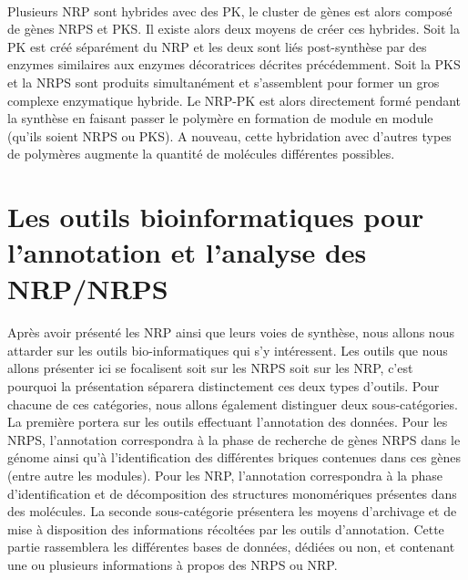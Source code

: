 \documentclass[12pt,french,twoside]{report}
\begin{document}
\paragraph{}Plusieurs NRP sont hybrides avec des PK, le cluster de gènes est alors composé de gènes NRPS et PKS.
Il existe alors deux moyens de créer ces hybrides.
Soit la PK est créé séparément du NRP et les deux sont liés post-synthèse par des enzymes similaires aux enzymes décoratrices décrites précédemment.
Soit la PKS et la NRPS sont produits simultanément et s'assemblent pour former un gros complexe enzymatique hybride.
Le NRP-PK est alors directement formé pendant la synthèse en faisant passer le polymère en formation de module en module (qu'ils soient NRPS ou PKS).
A nouveau, cette hybridation avec d'autres types de polymères augmente la quantité de molécules différentes possibles.









\section{Les outils bioinformatiques pour l'annotation et l'analyse des NRP/NRPS}

\paragraph{}Après avoir présenté les NRP ainsi que leurs voies de synthèse, nous allons nous attarder sur les outils bio-informatiques qui s'y intéressent.
Les outils que nous allons présenter ici se focalisent soit sur les NRPS soit sur les NRP, c'est pourquoi la présentation séparera distinctement ces deux types d'outils.
Pour chacune de ces catégories, nous allons également distinguer deux sous-catégories.
La première portera sur les outils effectuant l'annotation des données.
Pour les NRPS, l'annotation correspondra à la phase de recherche de gènes NRPS dans le génome ainsi qu'à l'identification des différentes briques contenues dans ces gènes (entre autre les modules).
Pour les NRP, l'annotation correspondra à la phase d'identification et de décomposition des structures monomériques présentes dans des molécules.
La seconde sous-catégorie présentera les moyens d'archivage et de mise à disposition des informations récoltées par les outils d'annotation.
Cette partie rassemblera les différentes bases de données, dédiées ou non, et contenant une ou plusieurs informations à propos des NRPS ou NRP.
\end{document}
